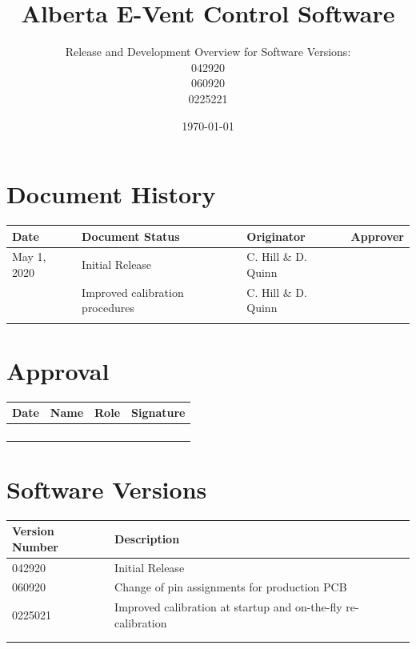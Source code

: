 \documentclass[]{article}
\title{Alberta E-Vent Control Software}
\author{Release and Development Overview for Software Versions:\\
	 042920\\
	 060920\\
 	0225221}
\begin{document}
	


\maketitle

\newpage

\section*{Document History}
\begin{center}
	\begin{tabular}{ |p{3cm}| p{3cm}| p{3cm}| p{3cm}|}
		\hline
		Date & Document Status & Originator & Approver \\
		\hline
		May 1, 2020 & Initial Release & C. Hill \& D. Quinn & \\
		\hline 
		 \date{\today} & Improved calibration procedures & C. Hill \& D. Quinn &  \\  
		\hline
		 &   &  & \\ 
		 \hline
	\end{tabular}
\end{center}

\section*{Approval}

\begin{center}
	\begin{tabular}{ |p{3cm}| p{3cm}| p{3cm}| p{3cm}|}
		\hline
		Date & Name & Role & Signature \\
		\hline 
		& &  &  \\  [2ex]
		\hline
		&   &  & \\ [2ex]
		\hline 
		&   &  & \\ [2ex]
		\hline   
		&   &  & \\ [2ex]
		\hline     
	\end{tabular}
\end{center}

\section*{Software Versions}

\begin{center}
	\begin{tabular}{ |p{3cm}| p{9cm}|}
		\hline
		Version Number & Description \\
		\hline 
		042920 & Initial Release   \\  [2ex]
		\hline
		060920 & Change of pin assignments for production PCB \\ [2ex]
		\hline 
		0225021 & Improved calibration at startup and on-the-fly re-calibration  \\ [2ex]
		\hline   
		&  \\ [2ex]
		\hline 
		&  \\ [2ex]
		\hline        
	\end{tabular}
\end{center}
\end{document}
